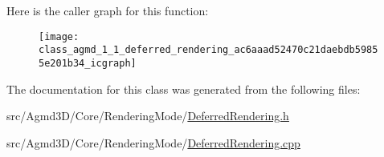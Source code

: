 Here is the caller graph for this function\+:\nopagebreak
\begin{figure}[H]
\begin{center}
\leavevmode
\texttt{[image: class\_agmd\_1\_1\_deferred\_rendering\_ac6aaad52470c21daebdb59855e201b34\_icgraph]}
\end{center}
\end{figure}




The documentation for this class was generated from the following files\+:\begin{DoxyCompactItemize}
\item 
src/\+Agmd3\+D/\+Core/\+Rendering\+Mode/\hyperlink{_deferred_rendering_8h}{Deferred\+Rendering.\+h}\item 
src/\+Agmd3\+D/\+Core/\+Rendering\+Mode/\hyperlink{_deferred_rendering_8cpp}{Deferred\+Rendering.\+cpp}\end{DoxyCompactItemize}
